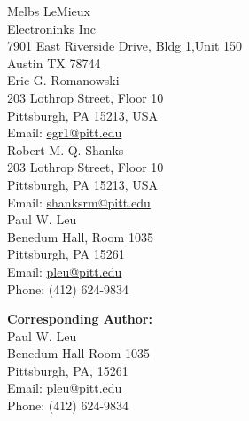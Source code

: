 \documentclass[12pt]{letter}
\begin{document}
Melbs LeMieux \\
Electroninks Inc \\ 
7901 East Riverside Drive, Bldg 1,Unit 150\\
Austin TX  78744 \\

Eric G. Romanowski\\
 203 Lothrop Street, Floor 10\\
Pittsburgh, PA 15213, USA\\
Email:  \href{mailto:egr1@pitt.edu}{egr1@pitt.edu}\\

Robert M. Q. Shanks\\
 203 Lothrop Street, Floor 10\\
Pittsburgh, PA 15213, USA\\
Email:  \href{mailto:shanksrm@pitt.edu}{shanksrm@pitt.edu}\\

Paul W. Leu\\
Benedum Hall, Room 1035 \\
Pittsburgh, PA 15261\\
Email:  \href{mailto:pleu@pitt.edu}{pleu@pitt.edu}\\
Phone: (412) 624-9834

\textbf{Corresponding Author:}\\
Paul W. Leu\\
Benedum Hall Room 1035 \\
Pittsburgh, PA, 15261\\
Email:  \href{mailto:pleu@pitt.edu}{pleu@pitt.edu}\\
Phone: (412) 624-9834





%
%
\end{document}
